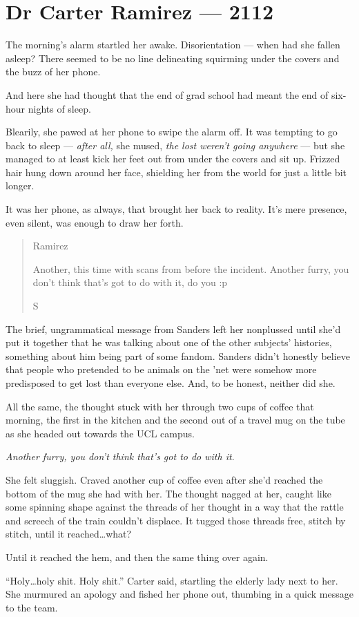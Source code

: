 \hypertarget{dr-carter-ramirez-2112}{%
\chapter*{Dr Carter Ramirez — 2112}\label{dr-carter-ramirez-2112}}

The morning's alarm startled her awake. Disorientation — when had she fallen asleep? There seemed to be no line delineating squirming under the covers and the buzz of her phone.

And here she had thought that the end of grad school had meant the end of six-hour nights of sleep.

Blearily, she pawed at her phone to swipe the alarm off. It was tempting to go back to sleep — \emph{after all,} she mused, \emph{the lost weren't going anywhere} — but she managed to at least kick her feet out from under the covers and sit up. Frizzed hair hung down around her face, shielding her from the world for just a little bit longer.

It was her phone, as always, that brought her back to reality. It's mere presence, even silent, was enough to draw her forth.

\begin{quote}
Ramirez

Another, this time with scans from before the incident. Another furry, you don't think that's got to do with it, do you :p

S
\end{quote}

The brief, ungrammatical message from Sanders left her nonplussed until she'd put it together that he was talking about one of the other subjects' histories, something about him being part of some fandom. Sanders didn't honestly believe that people who pretended to be animals on the 'net were somehow more predisposed to get lost than everyone else. And, to be honest, neither did she.

All the same, the thought stuck with her through two cups of coffee that morning, the first in the kitchen and the second out of a travel mug on the tube as she headed out towards the UCL campus.

\emph{Another furry, you don't think that's got to do with it}.

She felt sluggish. Craved another cup of coffee even after she'd reached the bottom of the mug she had with her. The thought nagged at her, caught like some spinning shape against the threads of her thought in a way that the rattle and screech of the train couldn't displace. It tugged those threads free, stitch by stitch, until it reached\ldots{}what?

Until it reached the hem, and then the same thing over again.

``Holy\ldots{}holy shit. Holy shit.'' Carter said, startling the elderly lady next to her. She murmured an apology and fished her phone out, thumbing in a quick message to the team.
